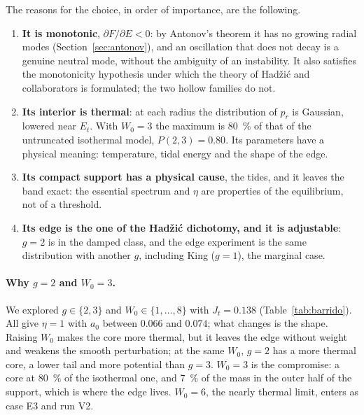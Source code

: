 \documentclass[11pt,a4paper]{article}
\begin{document}
The reasons for the choice, in order of importance, are the following.
\begin{enumerate}
\item \textbf{It is monotonic}, $\partial F/\partial E<0$: by Antonov's theorem it has no growing
radial modes (Section~\ref{sec:antonov}), and an oscillation that does not decay is a
genuine neutral mode, without the ambiguity of an instability. It also satisfies the
monotonicity hypothesis under which the theory of Hadžić and collaborators is
formulated; the two hollow families do not.
\item \textbf{Its interior is thermal}: at each radius the distribution of $p_r$ is Gaussian,
lowered near $E_t$. With $W_0=3$ the maximum is \SI{80}{\%} of that of the untruncated
isothermal model, $P(2,3)=0.80$. Its parameters have a physical meaning: temperature,
tidal energy and the shape of the edge.
\item \textbf{Its compact support has a physical cause}, the tides, and it leaves the band
exact: the essential spectrum and $\eta$ are properties of the equilibrium, not of a
threshold.
\item \textbf{Its edge is the one of the Hadžić dichotomy, and it is adjustable}: $g=2$ is in
the damped class, and the edge experiment is the same distribution with another $g$,
including King ($g=1$), the marginal case.
\end{enumerate}

\paragraph{Why $g=2$ and $W_0=3$.} We explored $g\in\{2,3\}$ and $W_0\in\{1,\ldots,8\}$ with
$J_t=0.138$ (Table~\ref{tab:barrido}). All give $\eta=1$ with $a_0$ between $0.066$ and $0.074$;
what changes is the shape. Raising $W_0$ makes the core more thermal, but it leaves the
edge without weight and weakens the smooth perturbation; at the same $W_0$, $g=2$ has a more
thermal core, a lower tail and more potential than $g=3$. $W_0=3$ is the compromise: a core
at \SI{80}{\%} of the isothermal one, and \SI{7}{\%} of the mass in the outer half of the
support, which is where the edge lives. $W_0=6$, the nearly thermal limit, enters as case
E3 and run V2.
\end{document}
